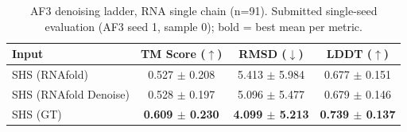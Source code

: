 \begin{table}[htbp]
\centering
\caption{AF3 denoising ladder, RNA single chain (n=91). Submitted single-seed evaluation (AF3 seed 1, sample 0); bold = best mean per metric.}
\label{tab:denoise_main}
\begin{tabular}{lccc}
\toprule
Input & TM Score ($\uparrow$) & RMSD ($\downarrow$) & LDDT ($\uparrow$) \\
\midrule
SHS (RNAfold) & 0.527 $\pm$ 0.208 & 5.413 $\pm$ 5.984 & 0.677 $\pm$ 0.151 \\
SHS (RNAfold Denoise) & 0.528 $\pm$ 0.197 & 5.096 $\pm$ 5.477 & 0.679 $\pm$ 0.146 \\
SHS (GT) & \textbf{0.609 $\pm$ 0.230} & \textbf{4.099 $\pm$ 5.213} & \textbf{0.739 $\pm$ 0.137} \\
\bottomrule
\end{tabular}
\end{table}

